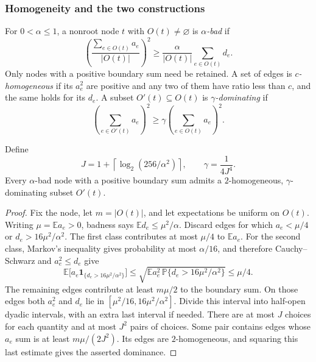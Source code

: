 

\subsubsection{Homogeneity and the two constructions}

\begin{definition}\label{hb:bad}
For $0<\alpha\le1$, a nonroot node $t$ with $O(t)\ne\varnothing$
is \emph{$\alpha$-bad} if
\[
 \left(\frac{\sum_{e\in O(t)}a_e}{|O(t)|}\right)^2
 \ge\frac{\alpha}{|O(t)|}\sum_{e\in O(t)}d_e.
\]
Only nodes with a positive boundary sum need be retained.
A set of edges is \emph{$c$-homogeneous} if its $a_e^2$ are positive
and any two of them have ratio less than $c$, and the same holds for
its $d_e$.  A subset $O'(t)\subseteq O(t)$ is
\emph{$\gamma$-dominating} if
\[
 \left(\sum_{e\in O'(t)}a_e\right)^2
 \ge\gamma\left(\sum_{e\in O(t)}a_e\right)^2.
\]
\end{definition}

\begin{lemma}\label{hb:bucketing}
Define
\[
 J=1+\left\lceil\log_2(256/\alpha^2)\right\rceil,
 \qquad \gamma=\frac1{4J^4}.
\]
Every $\alpha$-bad node with a positive boundary sum admits a
$2$-homogeneous, $\gamma$-dominating subset $O'(t)$.
\end{lemma}
\begin{proof}
Fix the node, let $m=|O(t)|$, and let expectations be uniform on $O(t)$.
Writing $\mu=\mathbb E a_e>0$, badness says
$\mathbb E d_e\le\mu^2/\alpha$.  Discard edges for which
$a_e<\mu/4$ or $d_e>16\mu^2/\alpha^2$.  The first class contributes
at most $\mu/4$ to $\mathbb E a_e$.  For the second class, Markov's
inequality gives probability at most $\alpha/16$, and therefore
Cauchy--Schwarz and $a_e^2\le d_e$ give
\[
 \mathbb E\bigl[a_e\mathbf1_{\{d_e>16\mu^2/\alpha^2\}}\bigr]
 \le\sqrt{\mathbb E a_e^2\,
          \mathbb P\{d_e>16\mu^2/\alpha^2\}}
 \le\mu/4.
\]
The remaining edges contribute at least $m\mu/2$ to the boundary sum.
On those edges both $a_e^2$ and $d_e$ lie in
$[\mu^2/16,16\mu^2/\alpha^2]$.  Divide this interval into half-open
dyadic intervals, with an extra last interval if needed.  There are
at most $J$ choices for each quantity and at most $J^2$ pairs of
choices.  Some pair contains edges whose $a_e$ sum is at least
$m\mu/(2J^2)$.  Its edges are $2$-homogeneous, and squaring this
last estimate gives the asserted dominance.
\end{proof}

